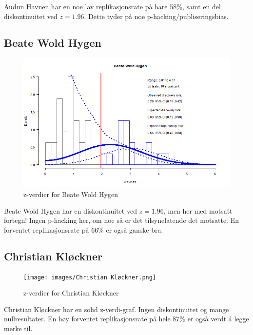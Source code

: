 \documentclass[doc,norsk]{apa7}
\begin{document}
Audun Havnen har en noe lav replikasjonsrate på bare 58\%, samt en del diskontinuitet ved $z=1.96$. Dette tyder på noe p-hacking/publiseringsbias.

\subsection{Beate Wold Hygen}
\begin{figure}[h!]
    \centering
    \includegraphics[width=\textwidth]{images/Beate Wold Hygen.png}
    \caption{z-verdier for Beate Wold Hygen}
\end{figure}

Beate Wold Hygen har en diskontinuitet ved $z=1.96$, men her med motsatt fortegn! Ingen p-hacking her, om noe så er det tilsynelatende det motsatte. En forventet replikasjonsrate på 66\% er også ganske bra.

\subsection{Christian Kløckner}
\begin{figure}[h!]
    \centering
    \texttt{[image: images/Christian Kløckner.png]}
    \caption{z-verdier for Christian Kløckner}
\end{figure}

Christian Kløckner har en solid z-verdi-graf. Ingen diskontinuitet og mange nullresultater. En høy forventet replikasjonsrate på hele 87\% er også verdt å legge merke til.
\end{document}
